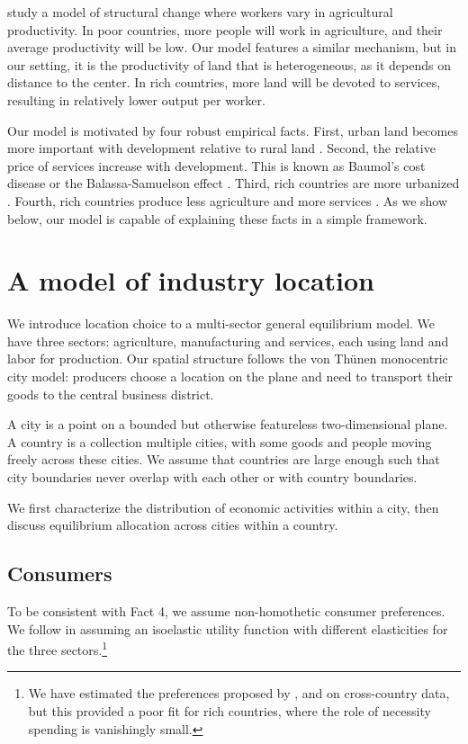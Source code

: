 \documentclass[12pt]{article}
\begin{document}
 study a model of structural change where workers vary in agricultural productivity. In poor countries, more people will work in agriculture, and their average productivity will be low. Our model features a similar mechanism, but in our setting, it is the productivity of land that is heterogeneous, as it depends on distance to the center. In rich countries, more land will be devoted to services, resulting in relatively lower output per worker.

Our model is motivated by four robust empirical facts. First, urban land becomes more important with development relative to rural land \cite[Figure 10.3]{Clark}. Second, the relative price of services increase with development. This is known as Baumol's cost disease \cite{Baumol65} or the Balassa-Samuelson effect \cite{Balassa64,Samuelson64}. Third, rich countries are more urbanized \cite{United_Nations2014-zm}. Fourth, rich countries produce less agriculture and more services \cite{Kuznets1973,Ngai2007,Kongsamut2001}. As we show below, our model is capable of explaining these facts in a simple framework.


\section{A model of industry location}
We introduce location choice to a multi-sector general equilibrium model. We have three sectors: agriculture, manufacturing and services, each using land and labor for production. Our spatial structure follows the von Thünen monocentric city model: producers choose a location on the plane and need to transport their goods to the central business district. 

A city is a point on a bounded but otherwise featureless two-dimensional plane. A country is a collection multiple cities, with some goods and people moving freely across these cities. We assume that countries are large enough such that city boundaries never overlap with each other or with country boundaries.

We first characterize the distribution of economic activities within a city, then discuss equilibrium allocation across cities within a country.

\subsection{Consumers}
To be consistent with Fact 4, we assume non-homothetic consumer preferences. We follow  in assuming an isoelastic utility function with different elasticities for the three sectors.\footnote{We have estimated the preferences proposed by ,  and  on cross-country data, but this provided a poor fit for rich countries, where the role of necessity spending is vanishingly small.}
\end{document}
